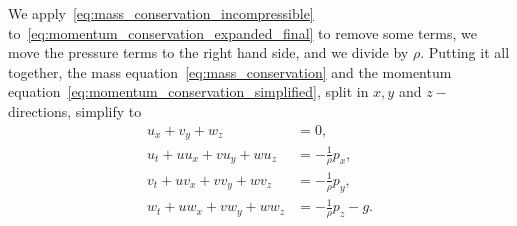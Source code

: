 We apply~\eqref{eq:mass_conservation_incompressible} to~\eqref{eq:momentum_conservation_expanded_final} to remove some terms, we move the pressure terms to the right hand side, and we divide by $\rho$.
Putting it all together, the mass equation~\eqref{eq:mass_conservation} and the momentum equation~\eqref{eq:momentum_conservation_simplified}, split in $x, y$ and $z-$directions, simplify to 
\begin{align}
    u_x + v_y + w_z &= 0 ,  \\
    u_t + u u_x + v u_y + w u_z &= - \frac{1}{\rho} p_x , \label{eq:momentum_conservation_x} \\
    v_t + u v_x + v v_y + w v_z &= - \frac{1}{\rho} p_y , \label{eq:momentum_conservation_y} \\
    w_t + u w_x + v w_y + w w_z &= - \frac{1}{\rho} p_z - g. \label{eq:momentum_conservation_z}
\end{align}


